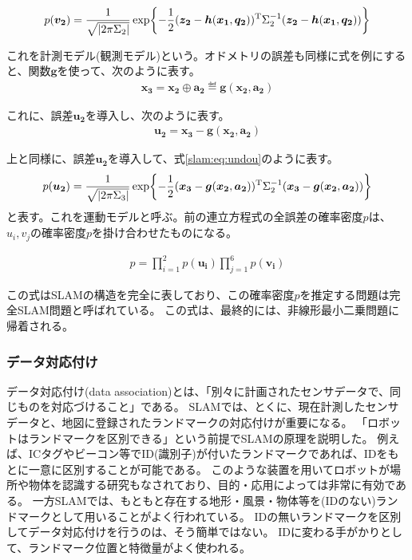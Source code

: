 \begin{align}
  p(\bm{v_2}) =\frac{1}{\sqrt{|2\pi\Sigma_2|}}\exp\biggl\{-\frac{1}{2}(\bm{z_2}-\bm{h}(\bm{x_1},\bm{q_2}))^{\rm{T}}\Sigma_2^{-1}(\bm{z_2}-\bm{h}(\bm{x_1},\bm{q_2}))\biggr\}\label{slam:eq:keisoku}
\end{align}

これを計測モデル(観測モデル)という。オドメトリの誤差も同様に式を例にすると、関数$\bm{g}$を使って、次のように表す。
\begin{align*}
  \bm{x_3} = \bm{x_2}\oplus \bm{a_2} \eqdef \bm{g}(\bm{x_2},\bm{a_2})
\end{align*}

これに、誤差$\bm{u_2}$を導入し、次のように表す。
\begin{align*}
  \bm{u_2} = \bm{x_3}-\bm{g}(\bm{x_2,a_2})
\end{align*}

上と同様に、誤差$\bm{u_2}$を導入して、式\eqref{slam:eq:undou}のように表す。
\begin{align}
  p(\bm{u_2}) = \frac{1}{\sqrt{|2\pi\Sigma_3|}}\exp\biggl\{-\frac{1}{2}(\bm{x_3}-\bm{g}(\bm{x_2},\bm{a_2}))^{\rm{T}}\Sigma_2^{-1}(\bm{x_3}-\bm{g}(\bm{x_2},\bm{a_2}))\biggr\} \label{slam:eq:undou}
\end{align}
と表す。これを運動モデルと呼ぶ。前の連立方程式の全誤差の確率密度$p$は、$u_i, v_j$の確率密度$p$を掛け合わせたものになる。

\begin{align}
  p = \prod_{i=1}^{2}p(\bm{u_i})\prod_{j=1}^{6}p(\bm{v_i})
\end{align}

この式はSLAMの構造を完全に表しており、この確率密度$p$を推定する問題は完全SLAM問題と呼ばれている。
この式は、最終的には、非線形最小二乗問題に帰着される。

\subsubsection{データ対応付け}
データ対応付け(data association)とは、「別々に計画されたセンサデータで、同じものを対応づけること」である。
SLAMでは、とくに、現在計測したセンサデータと、地図に登録されたランドマークの対応付けが重要になる。
「ロボットはランドマークを区別できる」という前提でSLAMの原理を説明した。
例えば、ICタグやビーコン等でID(識別子)が付いたランドマークであれば、IDをもとに一意に区別することが可能である。
このような装置を用いてロボットが場所や物体を認識する研究もなされており、目的・応用によっては非常に有効である。
一方SLAMでは、もともと存在する地形・風景・物体等を(IDのない)ランドマークとして用いることがよく行われている。
IDの無いランドマークを区別してデータ対応付けを行うのは、そう簡単ではない。
IDに変わる手がかりとして、ランドマーク位置と特徴量がよく使われる。

